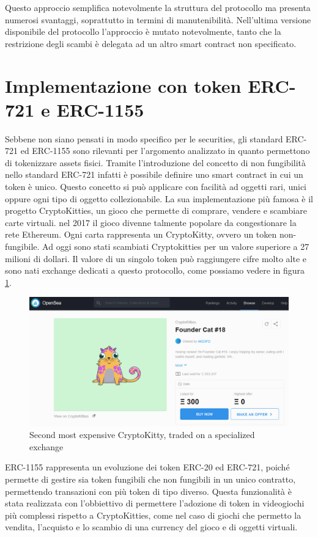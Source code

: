 Questo approccio semplifica notevolmente la struttura del protocollo ma presenta numerosi svantaggi, soprattutto in termini di manutenibilità. Nell'ultima versione disponibile del protocollo l'approccio è mutato notevolmente, tanto che la restrizione degli scambi è delegata ad un altro smart contract non specificato. 
\section{Implementazione con token ERC-721 e ERC-1155}
Sebbene non siano pensati in modo specifico per le securities, gli standard ERC-721 ed ERC-1155 sono rilevanti per l'argomento analizzato in quanto permettono di tokenizzare assets fisici. Tramite l'introduzione del concetto di non fungibilità nello standard ERC-721 infatti è possibile definire uno smart contract in cui un token è unico. Questo concetto si può applicare con facilità ad oggetti rari, unici oppure ogni tipo di oggetto collezionabile. La sua implementazione più famosa è il progetto CryptoKitties, un gioco che permette di comprare, vendere e scambiare carte virtuali. nel 2017 il gioco divenne talmente popolare da congestionare la rete Ethereum. Ogni carta rappresenta un CryptoKitty, ovvero un token  non-fungibile. Ad oggi sono stati scambiati Cryptokitties per un valore superiore a 27 milioni di dollari. Il valore di un singolo token può raggiungere cifre molto alte e sono nati exchange dedicati a questo protocollo, come possiamo vedere in figura \ref{fig:kitty}.
\begin{figure}[H]
  \includegraphics[width=\linewidth]{kitty.png}
  \caption{Second most expensive CryptoKitty, traded on a specialized exchange}
  \label{fig:kitty}
\end{figure}
ERC-1155 rappresenta un evoluzione dei token ERC-20 ed ERC-721, poiché permette di gestire sia token fungibili che non fungibili in un unico contratto, permettendo transazioni con più token di tipo diverso. Questa funzionalità è stata realizzata con l'obbiettivo di permettere l'adozione di token in videogiochi più complessi rispetto a CryptoKitties, come nel caso di giochi che permetto la vendita, l'acquisto e lo scambio di una currency del gioco e di oggetti virtuali. 

